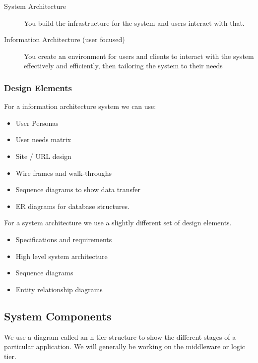 \begin{description}
    \item[System Architecture] You build the infrastructure for the system and users interact with that.
    \item[Information Architecture (user focused)] You create an environment for users and clients to interact with the system effectively and efficiently, then tailoring the system to their needs
\end{description}

\subsubsection{Design Elements}\label{ssub:design_elements}

For a information architecture system we can use:
\begin{itemize}
    \item User Personas
    \item User needs matrix
    \item Site / URL design
    \item Wire frames and walk-throughs
    \item Sequence diagrams to show data transfer
    \item ER diagrams for database structures.
\end{itemize}
For a system architecture we use a slightly different set of design elements.
\begin{itemize}
    \item Specifications and requirements
    \item High level system architecture
    \item Sequence diagrams
    \item Entity relationship diagrams
\end{itemize}

\subsection{System Components}\label{sub:system_components}

We use a diagram called an n-tier structure to show the different stages of a particular application.
We will generally be working on the middleware or logic tier.
\begin{center}
\end{center}

